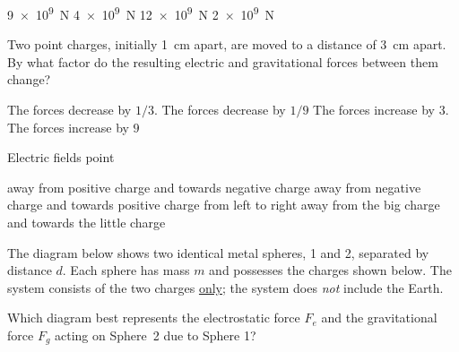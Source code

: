 \documentclass[]{exam}
\begin{document}
\begin{questions}
\begin{randomizechoices}
    \choice \SI{9e9}{N}
    \choice \SI{4e9}{N}
    \correctchoice \SI{12e9}{N}
    \choice \SI{2e9}{N}
\end{randomizechoices}

\question
Two point charges, initially \SI{1}{cm} apart, are moved to a distance of \SI{3}{cm} apart. By what factor do the resulting electric and gravitational forces between them change?

\begin{randomizechoices}
    \choice The forces decrease by $1/3$.
    \correctchoice The forces decrease by $1/9$
    \choice The forces increase by $3$.
    \choice The forces increase by $9$
\end{randomizechoices}

\question
Electric fields point

\begin{randomizechoices}
    \correctchoice away from positive charge and towards negative charge
    \choice away from negative charge and towards positive charge
    \choice from left to right
    \choice away from the big charge and towards the little charge  
\end{randomizechoices}

\question
The diagram below shows two identical metal spheres, 1 and 2, separated by distance $d$. Each sphere has mass $m$ and possesses the charges shown below. The system consists of the two charges \underline{only}; the system does \textit{not} include the Earth.

\begin{center}
\end{center}

Which diagram best represents the electrostatic force $F_e$ and the gravitational force $F_g$ acting on Sphere~2 due to Sphere 1?


\end{questions}
\end{document}

